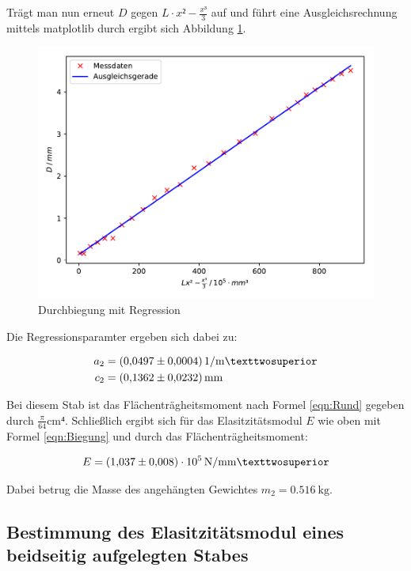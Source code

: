 Trägt man nun erneut $D$ gegen $L\cdot x²-\frac{x³}{3}$ auf und führt eine
Ausgleichsrechnung mittels matplotlib durch ergibt sich Abbildung \ref{fig:plot2}. 

\begin{figure}
  \centering
  \includegraphics[scale=0.8]{content/plot2.pdf}
  \caption{Durchbiegung mit Regression}
  \label{fig:plot2}
\end{figure}

Die Regressionsparamter ergeben sich dabei zu: 

\begin{align*}
a_2 &= \SI{0.0497+-0.0004}{1\per\meter²}\\ 
c_2 &= \SI{0.1362+-0.0232}{\milli\meter}
\end{align*}

Bei diesem Stab ist das Flächenträgheitsmoment nach Formel \eqref{eqn:Rund}
gegeben durch $\frac{\pi}{64}\si{\centi\meter⁴}$.
Schließlich ergibt sich für das Elasitzitätsmodul $E$ wie oben mit Formel 
\eqref{eqn:Biegung} und durch das Flächenträgheitsmoment:

\begin{equation*}
E = \SI{1.037+-0.008e5}{\newton\per\milli\meter²}
\end{equation*}

Dabei betrug die Masse des angehängten Gewichtes $m_2 = \SI{0.516}{\kilo\gram}$.

\subsection{Bestimmung des Elasitzitätsmodul eines beidseitig aufgelegten Stabes}

